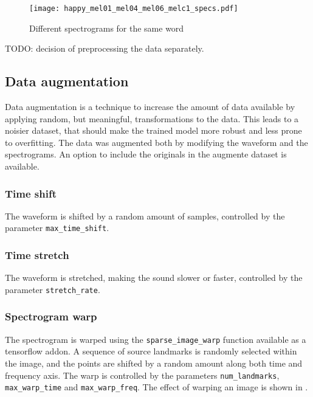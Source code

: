 \begin{figure}[t!]
    \centering
    \texttt{[image: happy\_mel01\_mel04\_mel06\_melc1\_specs.pdf]}
    \caption{Different spectrograms for the same word}%
    \label{fig:happy_mel01_mel04_mel06_melc1_specs}
\end{figure}

TODO: decision of preprocessing the data separately.

\subsection{Data augmentation}

Data augmentation is a technique to increase the amount of data available by
applying random, but meaningful, transformations to the data. This leads to a
noisier dataset, that should make the trained model more robust and less prone
to overfitting. The data was augmented both by modifying the waveform and the
spectrograms. An option to include the originals in the augmente dataset is
available.

\subsubsection{Time shift}

The waveform is shifted by a random amount of samples, controlled by the
parameter \texttt{max\_time\_shift}.

\subsubsection{Time stretch}

The waveform is stretched, making the sound slower or faster, controlled by the
parameter \texttt{stretch\_rate}.

\subsubsection{Spectrogram warp}

The spectrogram is warped using the \texttt{sparse\_image\_warp} function
available as a tensorflow addon.
A sequence of source landmarks is randomly selected within the image, and the
points are shifted by a random amount along both time and frequency axis. The
warp is controlled by the parameters \texttt{num\_landmarks},
\texttt{max\_warp\_time} and \texttt{max\_warp\_freq}.
The effect of warping an image is shown in .

